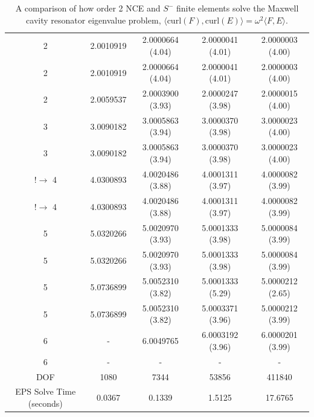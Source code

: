 \documentclass[manuscript,screen]{acmart}
\begin{document}
\begin{center}
\begin{table}
\begin{tabular}{ c c c c c }
\hline
2 &2.0010919 & 2.0000664 (4.04) & 2.0000041 (4.01) & 2.0000003 (4.00) \\  
2 & 2.0010919 & 2.0000664 (4.04) & 2.0000041 (4.01) & 2.0000003 (4.00)  \\
2 & 2.0059537 & 2.0003900 (3.93) & 2.0000247 (3.98) & 2.0000015 (4.00)\\
3 & 3.0090182 & 3.0005863 (3.94) & 3.0000370 (3.98) & 3.0000023 (4.00) \\
3 & 3.0090182 & 3.0005863 (3.94) & 3.0000370 (3.98) & 3.0000023 (4.00) \\
$! \rightarrow$ 4 & 4.0300893 & 4.0020486 (3.88) & 4.0001311 (3.97) & 4.0000082 (3.99) \\
$! \rightarrow$ 4 & 4.0300893 & 4.0020486 (3.88) & 4.0001311 (3.97) & 4.0000082 (3.99) \\
5 & 5.0320266 & 5.0020970 (3.93)& 5.0001333 (3.98) & 5.0000084 (3.99) \\
5 & 5.0320266 & 5.0020970 (3.93)& 5.0001333 (3.98) & 5.0000084 (3.99) \\
5 & 5.0736899 & 5.0052310 (3.82) & 5.0001333 (5.29) & 5.0000212 (2.65) \\
5 & 5.0736899 & 5.0052310 (3.82) & 5.0003371 (3.96) & 5.0000212 (3.99) \\
6 & - & 6.0049765 & 6.0003192 (3.96) & 6.0000201 (3.99) \\
6 & - & - & - & - \\
\hline
DOF  & 1080 & 7344 & 53856 & 411840 \\
\hline
EPS Solve Time (seconds) & 0.0367 & 0.1339 & 1.5125 & 17.6765 \\
\hline

\end{tabular}
\caption{A comparison of how order 2 NCE and $S^-$ finite elements solve the Maxwell cavity resonator eigenvalue problem, $\langle \text{curl}(F), \text{curl}(E) \rangle = \omega^2 \langle F, E \rangle$. }  
\label{tab:Eigenvalue}
\end{table}
\end{center}
\end{document}
